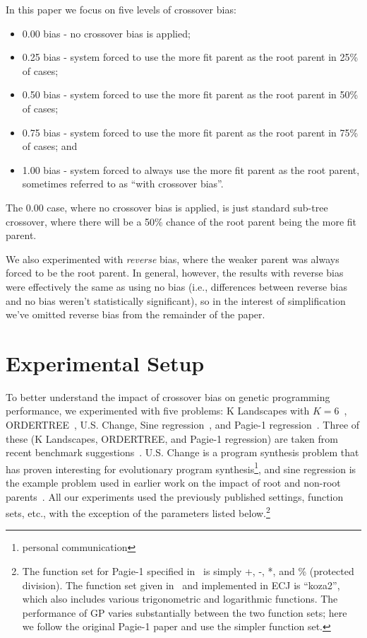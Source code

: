 \documentclass{sig-alternate}
\begin{document}
In this paper we focus on five levels of crossover bias:
\begin{itemize}
\item 0.00 bias - no crossover bias is applied;
\item 0.25 bias - system forced to use the more fit parent as the root parent in 25\% of cases;
\item 0.50 bias - system forced to use the more fit parent as the root parent in 50\% of cases;
\item 0.75 bias - system forced to use the more fit parent as the root parent in 75\% of cases; and
\item 1.00 bias - system forced to always use the more fit parent as the root parent, sometimes referred to as ``with crossover bias''.
\end{itemize}
The 0.00 case, where no crossover bias is applied, is just standard sub-tree crossover, where there will be a 50\% chance of the root parent being the more fit parent.

We also experimented with \emph{reverse} bias, where the weaker parent was always forced to be 
the root parent. In general, however, the results with reverse bias were effectively the same as using 
no bias (i.e., differences between reverse bias and no bias weren't statistically significant), so in the 
interest of simplification we've omitted reverse bias from the remainder of the paper.

\section{Experimental Setup} \label{sec:Experiments}

To better understand the impact of crossover bias on genetic programming performance, we 
experimented with five problems: K Landscapes with $K=6$~\cite{vanneschi2011k}, 
ORDER\-TREE~\cite{hoang2006ordertree}, U.S. Change, Sine regression~\cite{poli08:fieldguide}, 
and Pagie-1 regression~\cite{pagie1997evolutionary}.
Three of these (K Landscapes, ORDERTREE, and Pagie-1 regression) are taken from recent benchmark 
suggestions~\cite{gp-benchmarks-2013}. U.S. Change is a program synthesis problem  that has proven 
interesting for evolutionary program synthesis\footnote{personal communication}, and sine regression 
is the example problem used in earlier work on the impact of root and non-root 
parents~\cite{McPheeDonatucciDramdahl:2014}. All our experiments used the previously published
settings, function sets, etc., with the exception of the parameters listed below.\footnote{The function 
set for Pagie-1 specified in~\cite{pagie1997evolutionary} is simply +, -, *, and \% (protected division). 
The function set given in~\cite{mcdermott2012genetic} and implemented in ECJ is ``koza2'', which 
also includes various trigonometric and logarithmic functions. The performance of GP varies 
substantially between the two function sets; here we follow the original Pagie-1 paper and use the 
simpler function set.}
\end{document}
